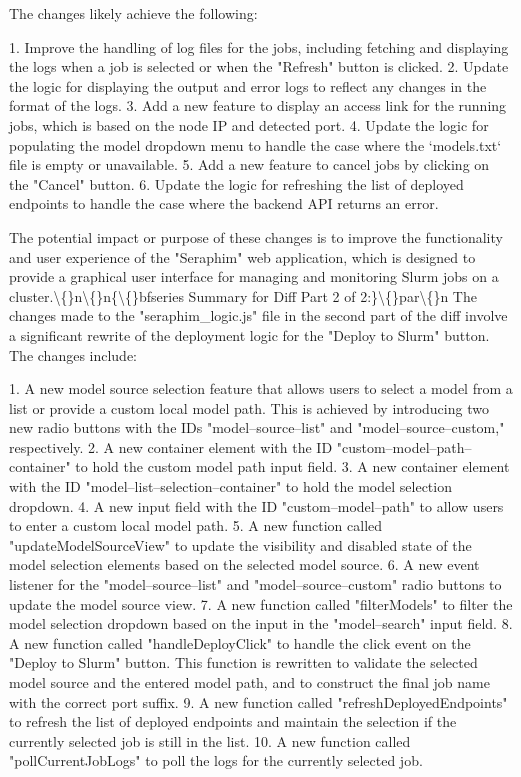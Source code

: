 \documentclass{article}
\begin{document}
{The changes likely achieve the following:

1. Improve the handling of log files for the jobs, including fetching and displaying the logs when a job is selected or when the "Refresh" button is clicked.
2. Update the logic for displaying the output and error logs to reflect any changes in the format of the logs.
3. Add a new feature to display an access link for the running jobs, which is based on the node IP and detected port.
4. Update the logic for populating the model dropdown menu to handle the case where the `models.txt` file is empty or unavailable.
5. Add a new feature to cancel jobs by clicking on the "Cancel" button.
6. Update the logic for refreshing the list of deployed endpoints to handle the case where the backend API returns an error.

The potential impact or purpose of these changes is to improve the functionality and user experience of the "Seraphim" web application, which is designed to provide a graphical user interface for managing and monitoring Slurm jobs on a cluster.\textbackslash\{\}n\textbackslash\{\}n\{\textbackslash\{\}bfseries Summary for Diff Part 2 of 2:\}\textbackslash\{\}par\textbackslash\{\}n  The changes made to the "seraphim\_logic.js" file in the second part of the diff involve a significant rewrite of the deployment logic for the "Deploy to Slurm" button. The changes include:

1. A new model source selection feature that allows users to select a model from a list or provide a custom local model path. This is achieved by introducing two new radio buttons with the IDs "model--source--list" and "model--source--custom," respectively.
2. A new container element with the ID "custom--model--path--container" to hold the custom model path input field.
3. A new container element with the ID "model--list--selection--container" to hold the model selection dropdown.
4. A new input field with the ID "custom--model--path" to allow users to enter a custom local model path.
5. A new function called "updateModelSourceView" to update the visibility and disabled state of the model selection elements based on the selected model source.
6. A new event listener for the "model--source--list" and "model--source--custom" radio buttons to update the model source view.
7. A new function called "filterModels" to filter the model selection dropdown based on the input in the "model--search" input field.
8. A new function called "handleDeployClick" to handle the click event on the "Deploy to Slurm" button. This function is rewritten to validate the selected model source and the entered model path, and to construct the final job name with the correct port suffix.
9. A new function called "refreshDeployedEndpoints" to refresh the list of deployed endpoints and maintain the selection if the currently selected job is still in the list.
10. A new function called "pollCurrentJobLogs" to poll the logs for the currently selected job.

}
\end{document}
